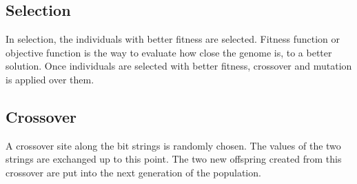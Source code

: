 \subsection{Selection}{\label{section:Selection} 
In selection, the individuals with better fitness are selected. Fitness function or objective function is the way to evaluate how close the genome is, to a better solution. Once individuals are selected with better fitness, crossover and mutation is applied over them.
\subsection{Crossover}{\label{section:Crossover}
A crossover site along the bit strings is randomly chosen. The values of the two strings are exchanged up to this point. The two new offspring created from this crossover are put into the next generation of the population. 
}}
